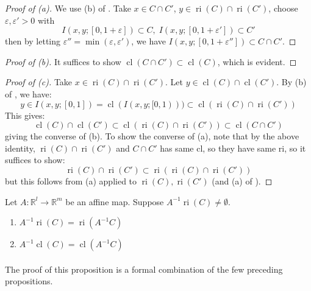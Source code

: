 \begin{proof}[Proof of (a)]
	We use (b) of . Take $x\in C\cap C'$, $y\in \operatorname{ri}(C)\cap \operatorname{ri}(C')$, choose $\varepsilon,\varepsilon'>0$ with
	\[
		I(x,y;[0,1+\varepsilon ])\subset C,\;
		I(x,y;[0,1+\varepsilon' ])\subset C'
	\]
	then by letting $\varepsilon''=\min(\varepsilon ,\varepsilon')$, we have $I(x,y;[0,1+\varepsilon'' ])\subset C\cap C'$.
\end{proof}

\begin{proof}[Proof of (b)]
	It suffices to show $\operatorname{cl}(C\cap C')\subset \operatorname{cl}(C)$, which is evident.
\end{proof}

\begin{proof}[Proof of (c)]
	Take $x\in \operatorname{ri}(C) \cap\operatorname{ri}(C')$. Let $y\in \operatorname{cl}(C)\cap \operatorname{cl}(C')$. By (b) of , we have:
	\[
		y\in I(x, y;[0, 1])=\operatorname{cl}(I(x, y;[0, 1)))\subset\operatorname{cl}(\operatorname{ri}(C)\cap \operatorname{ri}(C'))
	\]
	This gives:
	\[
		\operatorname{cl}(C)\cap \operatorname{cl}(C')\subset \operatorname{cl}(\operatorname{ri}(C)\cap \operatorname{ri}(C'))\subset \operatorname{cl}(C\cap C')
	\]
	giving the converse of (b). To show the converse of (a), note that by the above identity, $\operatorname{ri}(C)\cap \operatorname{ri}(C')$ and $C\cap C'$ has same cl, so they have same ri, so it suffices to show:
	\[
		\operatorname{ri}(C)\cap \operatorname{ri}(C')\subset
		\operatorname{ri}(\operatorname{ri}(C)\cap \operatorname{ri}(C'))
	\]
	but this follows from (a) applied to $\operatorname{ri}(C),\operatorname{ri}(C')$ (and (a) of ).
\end{proof}

\begin{prop}
	\label{prop:012-inv-img-rule}
	Let $A:\mathbb{R}^l\to \mathbb{R}^m$ be an affine map. Suppose $A^{-1}\operatorname{ri}(C)\neq \emptyset$.
	\begin{enumerate}[label=(\alph*)]
		\item $A^{-1}\operatorname{ri}(C)=\operatorname{ri}(A^{-1}C)$
		\item $A^{-1}\operatorname{cl}(C)=\operatorname{cl}(A^{-1}C)$
	\end{enumerate}
\end{prop}

\paragraph{}The proof of this proposition is a formal combination of the few preceding propositions.

